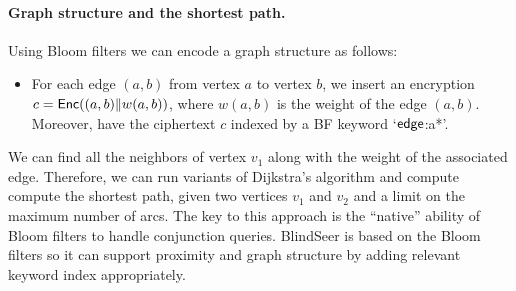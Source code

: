 \paragraph{Graph structure and the shortest path.}
Using Bloom filters we can encode a graph structure as follows:
\begin{itemize}
\item For each edge $(a, b)$ from vertex $a$ to vertex $b$, we insert an
  encryption $c = \mathsf{Enc}((a,b) \| w(a,b) )$, where $w(a,b)$ is the weight of the edge
    $(a,b)$. Moreover, have the ciphertext $c$ indexed by a BF keyword `$\sf edge$:a*'. 
\end{itemize}

\noindent
We can find all the neighbors of vertex $v_1$
along with the weight of the associated edge. Therefore, we can run variants of
Dijkstra's algorithm and compute compute the shortest path, given two vertices
$v_1$ and $v_2$ and a limit on the maximum number of arcs. The key to this approach is the ``native'' ability of Bloom filters to handle conjunction queries.
BlindSeer is based on the Bloom filters so it can support proximity and graph structure by adding
relevant keyword index appropriately.
%
